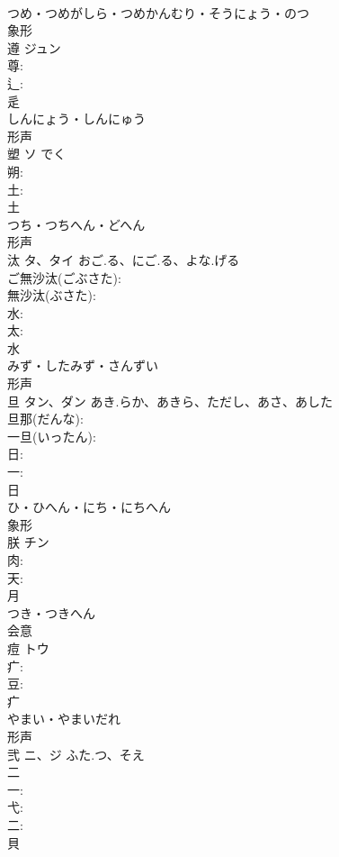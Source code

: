 \documentclass[8pt]{extreport}
\begin{document}
\begin{CJK}{UTF8}{min}
\\	つめ・つめがしら・つめかんむり・そうにょう・のつ	
\\	象形 
\\	遵	ジュン			
\\	尊: 
\\	辶: 
\\	辵	
\\	しんにょう・しんにゅう	
\\	形声 
\\	塑	ソ	でく		
\\	朔: 
\\	土: 
\\	土	
\\	つち・つちへん・どへん	
\\	形声 
\\	汰	タ、タイ	おご.る、にご.る、よな.げる		
\\	ご無沙汰(ごぶさた): 
\\	無沙汰(ぶさた): 
\\	水: 
\\	太: 
\\	水	
\\	みず・したみず・さんずい	
\\	形声 
\\	旦	タン、ダン	あき.らか、あきら、ただし、あさ、あした		
\\	旦那(だんな): 
\\	一旦(いったん): 
\\	日: 
\\	一: 
\\	日	
\\	ひ・ひへん・にち・にちへん	
\\	象形 
\\	朕	チン			
\\	肉: 
\\	天: 
\\	月	
\\	つき・つきへん	
\\	会意 
\\	痘	トウ			
\\	疒: 
\\	豆: 
\\	疒	
\\	やまい・やまいだれ	
\\	形声 
\\	弐	ニ、ジ	ふた.つ、そえ		
\\	二 
\\	一: 
\\	弋: 
\\	二: 
\\	貝	

\end{CJK}
\end{document}
